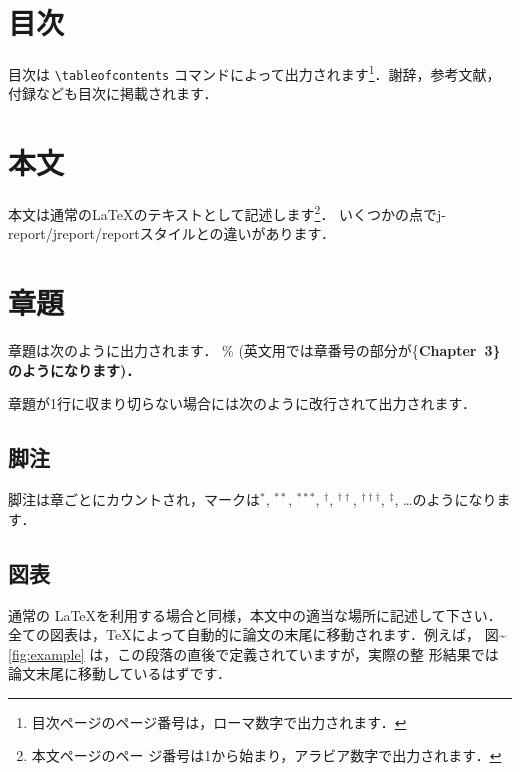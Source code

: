 \documentclass[
  sotsuron]{kuee}
\begin{document}
\hypertarget{ux76eeux6b21}{%
\section{目次}\label{ux76eeux6b21}}

目次は \verb+\tableofcontents+ コマンドによって出力されます\footnote
{目次ページのページ番号は，ローマ数字で出力されます．}．謝辞，参考文献，
付録なども目次に掲載されます．

\hypertarget{ux672cux6587}{%
\section{本文}\label{ux672cux6587}}

本文は通常の\LaTeX のテキストとして記述します\footnote{本文ページのペー
  ジ番号は1から始まり，アラビア数字で出力されます．}．
いくつかの点でj-report/jreport/reportスタイルとの違いがあります．

\hypertarget{ux7ae0ux984c}{%
\section{章題}\label{ux7ae0ux984c}}

章題は次のように出力されます． \%
(英文用では章番号の部分が\{\LARGE\bfseries Chapter~3\}のようになります)．

章題が1行に収まり切らない場合には次のように改行されて出力されます．

\hypertarget{ux811aux6ce8}{%
\subsection{脚注}\label{ux811aux6ce8}}

脚注は章ごとにカウントされ，マークは\(^{*}\), \(^{**}\), \(^{***}\),
\(^{\dagger}\), \(^{\dagger\dagger}\), \(^{\dagger\dagger\dagger}\),
\(^{\ddagger}\), \ldots のようになります．

\hypertarget{ux56f3ux8868}{%
\subsection{図表}\label{ux56f3ux8868}}

通常の \LaTeX を利用する場合と同様，本文中の適当な場所に記述して下さい．
全ての図表は，\TeX によって自動的に論文の末尾に移動されます．例えば，
図\textasciitilde{}\ref{fig:example}
は，この段落の直後で定義されていますが，実際の整
形結果では論文末尾に移動しているはずです．
\end{document}
